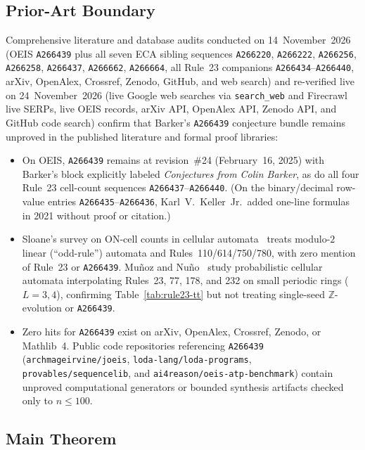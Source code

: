 \documentclass[11pt]{article}
\theoremstyle{definition}
\newcommand{\Z}{\mathbb{Z}}
\newcommand{\seq}[1]{\texttt{#1}}
\begin{document}
\subsection{Prior-Art Boundary}
\label{sec:prior-art}

Comprehensive literature and database audits conducted on 14~November~2026 (OEIS \seq{A266439} plus all seven ECA sibling sequences \seq{A266220}, \seq{A266222}, \seq{A266256}, \seq{A266258}, \seq{A266437}, \seq{A266662}, \seq{A266664}, all Rule~23 companions \seq{A266434}--\seq{A266440}, arXiv, OpenAlex, Crossref, Zenodo, GitHub, and web search) and re-verified live on 24~November~2026 (live Google web searches via \texttt{search\_web} and Firecrawl live SERPs, live OEIS records, arXiv API, OpenAlex API, Zenodo API, and GitHub code search) confirm that Barker's \seq{A266439} conjecture bundle remains unproved in the published literature and formal proof libraries:
\begin{itemize}
\item On OEIS, \seq{A266439} remains at revision~\#24 (February~16, 2025) with Barker's block explicitly labeled \emph{Conjectures from Colin Barker}, as do all four Rule~23 cell-count sequences \seq{A266437}--\seq{A266440}. (On the binary/decimal row-value entries \seq{A266435}--\seq{A266436}, Karl~V.\ Keller~Jr.\ added one-line formulas in 2021 without proof or citation.)
\item Sloane's survey on ON-cell counts in cellular automata~\cite{sloane2015} treats modulo-$2$ linear (``odd-rule'') automata and Rules~110/614/750/780, with zero mention of Rule~23 or \seq{A266439}. Mu\~noz and Nu\~no~\cite{munoznuno2026} study probabilistic cellular automata interpolating Rules~23, 77, 178, and 232 on small periodic rings ($L = 3, 4$), confirming Table~\ref{tab:rule23-tt} but not treating single-seed $\Z$-evolution or \seq{A266439}.
\item Zero hits for \seq{A266439} exist on arXiv, OpenAlex, Crossref, Zenodo, or Mathlib~4. Public code repositories referencing \seq{A266439} (\texttt{archmageirvine/joeis}, \texttt{loda-lang/loda-programs}, \texttt{provables/sequencelib}, and \texttt{ai4reason/oeis-atp-benchmark}) contain unproved computational generators or bounded synthesis artifacts checked only to $n \le 100$.
\end{itemize}

\subsection{Main Theorem}
\end{document}
